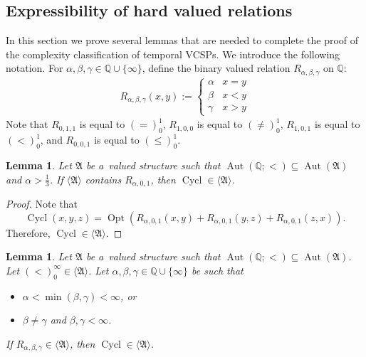 \documentclass[preprint,12pt]{elsarticle}
\newcommand{\Q}{\mathbb Q}
\newcommand{\bA}{{\mathfrak A}}
\DeclareMathOperator{\Cyc}{Cycl}
\DeclareMathOperator{\Aut}{Aut}
\DeclareMathOperator{\Opt}{Opt}
\newtheorem{lemma}[theorem]{Lemma}
\begin{document}
\subsection{Expressibility of hard valued relations} 
In this section we prove several lemmas that are needed to complete the proof of the complexity classification of temporal VCSPs.
%
We introduce the following notation.
For $\alpha,\beta,\gamma \in {\mathbb Q} \cup \{\infty\}$, 
define the binary valued relation
$R_{\alpha,\beta,\gamma}$
on ${\mathbb Q}$:
\begin{align*}
    R_{\alpha,\beta,\gamma}(x,y) := \begin{cases} 
    \alpha & x=y \\
    \beta & x<y \\
    \gamma & x > y 
    \end{cases}
\end{align*}
%
Note that $R_{0,1,1}$ is equal to $(=)_0^1$, $R_{1,0,0}$ is equal to $(\neq)_0^1$, $R_{1,0,1}$ is equal to $(<)_0^1$, and $R_{0,0,1}$ is equal to $(\leq)_0^1$.

\begin{lemma} \label{lem:soft-ord}
Let $\bA$ be a~valued structure such that $\Aut(\Q;<) \subseteq \Aut(\bA)$ and $\alpha > \frac{1}{3}$.
If $\langle \bA \rangle$ contains
$R_{\alpha,0,1}$, 
then 
$\Cyc \in \langle \bA \rangle$.
\end{lemma}


\begin{proof}
Note that 
\[\Cyc(x,y,z) = \Opt( R_{\alpha,0,1}(x,y)+R_{\alpha,0,1}(y,z) + R_{\alpha,0,1}(z,x)).\] Therefore, $\Cyc \in \langle \bA \rangle$.
\end{proof}

\begin{lemma}\label{lem:3-val-rels}
Let $\bA$ be a~valued structure such that $\Aut(\Q;<) \subseteq \Aut(\bA)$. Let $(<)_0^\infty \in \langle \bA \rangle$. Let $\alpha, \beta, \gamma \in \mathbb{Q} \cup \{\infty\}$ be such that 
\begin{itemize}
\item $\alpha < \min(\beta, \gamma) < \infty$, or
\item $\beta \neq \gamma$ and $\beta, \gamma < \infty$.
\end{itemize}
If $R_{\alpha, \beta, \gamma} \in \langle \bA \rangle$, then
$\Cyc \in \langle \bA \rangle$. 
\end{lemma}
\end{document}
